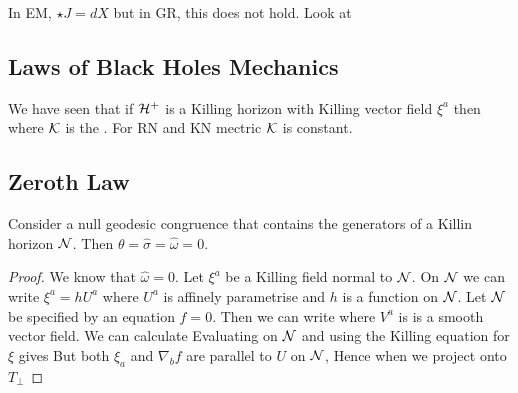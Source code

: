 \documentclass{article}
\begin{document}
In EM, $\star J = dX$ but in GR, this does not hold. Look at 

\begin{lemma}

\section{Laws of Black Holes Mechanics}

We have seen that if $\mathcal{H}^+$ is a Killing horizon with Killing vector field $\xi^a$ then 
where $\mathcal{K}$ is the . For RN and KN mectric $\mathcal{K}$ is constant.
\subsection{Zeroth Law}

\begin{prop}
Consider a null geodesic congruence that contains the generators of a Killin horizon $\mathcal{N}$. Then $\theta = \hat{\sigma} = \hat{\omega} = 0$. 
\end{prop}
\begin{proof}
We know that $\hat{\omega}=0$. Let $\xi^a$ be a Killing field normal to $\mathcal{N}$. On $\mathcal{N}$ we can write $\xi^a = h U^a$ where $U^a$ is affinely parametrise and $h$ is a function on $\mathcal{N}$. Let $\mathcal{N}$ be specified by an equation $f=0$. Then we can write 
where $V^a$ is is a smooth vector field. We can calculate 
Evaluating on $\mathcal{N}$ and using the Killing equation for $\xi$ gives 
But both $\xi_a$ and $\nabla_b f$ are parallel to $U$ on $\mathcal{N}$, Hence when we project onto $T_\perp$ 
\end{proof}


\end{lemma}
\end{document}
